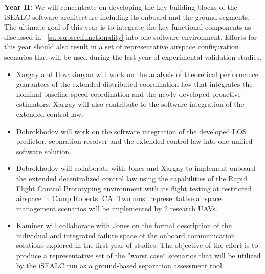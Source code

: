 \documentclass[letter,onecolumn,12pt]{aiaa-tc}
\newcommand{\1}{1_n}
\begin{document}
\textbf{Year II:} We will concentrate on developing the key building blocks of the iSEALC software architecture
including its onboard and the ground segments. The ultimate goal of this year is to integrate the key functional
components as discussed in ~\ref{subsubsec:functionality} into one software environment. Efforts for this year
should also result in a set of representative airspace configuration scenarios that will be used during the last
year of experimental validation studies.
\vspace{-3mm}
\begin{itemize}
\setlength{\itemsep}{-4pt}
    \item Xargay and Hovakimyan will work on the analysis of theoretical performance guarantees of the extended distributed coordination law that integrates the nominal baseline speed coordination and the newly developed proactive estimators. Xargay will also contribute to the software integration of the extended control law.

    \item Dobrokhodov will work on the software integration of the developed LOS predictor, separation resolver and the extended control law into one unified software solution.

    \item Dobrokhodov will collaborate with Jones and Xargay to implement onboard the extended decentralized control law using the capabilities of the Rapid Flight Control Prototyping environment with its flight testing at restricted airspace in Camp Roberts, CA. Two most representative airspace management scenarios will be implemented by 2 research UAVs.

    \item Kaminer will collaborate with Jones on the formal description of the individual and integrated failure space of the onboard communication solutions explored in the first year of studies. The objective of the effort is to produce a representative set of the ''worst case`` scenarios that will be utilized by the iSEALC run as a ground-based separation assessment tool.
\end{itemize}
\vspace{-2mm}
\end{document}
